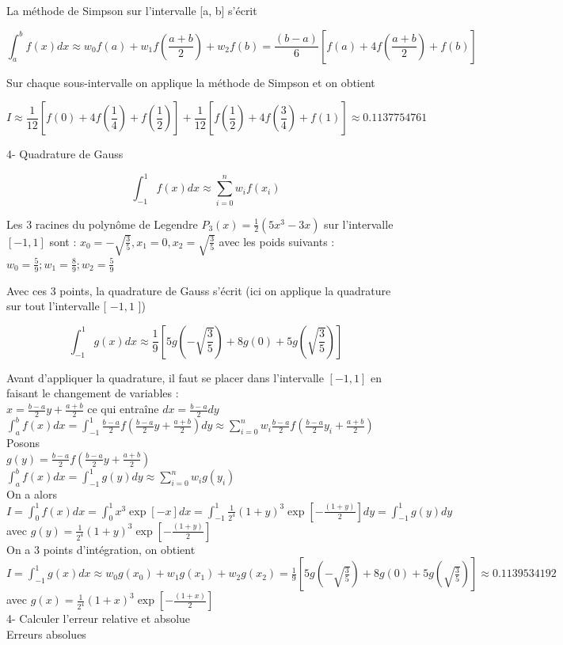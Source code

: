 \documentclass[10pt]{article}
\begin{document}
La méthode de Simpson sur l'intervalle [a, b] s'écrit

\[
\int_{a}^{b} f(x) d x \approx w_{0} f(a)+w_{1} f\left(\frac{a+b}{2}\right)+w_{2} f(b)=\frac{(b-a)}{6}\left[f(a)+4 f\left(\frac{a+b}{2}\right)+f(b)\right]
\]

Sur chaque sous-intervalle on applique la méthode de Simpson et on obtient

\[
I \approx \frac{1}{12}\left[f(0)+4 f\left(\frac{1}{4}\right)+f\left(\frac{1}{2}\right)\right]+\frac{1}{12}\left[f\left(\frac{1}{2}\right)+4 f\left(\frac{3}{4}\right)+f(1)\right] \approx 0.1137754761
\]

4- Quadrature de Gauss

\[
\int_{-1}^{1} f(x) d x \approx \sum_{i=0}^{n} w_{i} f\left(x_{i}\right)
\]

Les 3 racines du polynôme de Legendre \(P_{3}(x)=\frac{1}{2}\left(5 x^{3}-3 x\right)\) sur l'intervalle \([-1,1]\) sont : \(x_{0}=-\sqrt{\frac{3}{5}}, x_{1}=0, x_{2}=\sqrt{\frac{3}{5}}\) avec les poids suivants : \(w_{0}=\frac{5}{9} ; w_{1}=\frac{8}{9} ; w_{2}=\frac{5}{9}\)

Avec ces 3 points, la quadrature de Gauss s'écrit (ici on applique la quadrature sur tout l'intervalle [ \(-1,1\) ])

\[
\int_{-1}^{1} g(x) d x \approx \frac{1}{9}\left[5 g\left(-\sqrt{\frac{3}{5}}\right)+8 g(0)+5 g\left(\sqrt{\frac{3}{5}}\right)\right]
\]

Avant d'appliquer la quadrature, il faut se placer dans l'intervalle \([-1,1]\) en faisant le changement de variables :\\
\(x=\frac{b-a}{2} y+\frac{a+b}{2}\) ce qui entraîne \(d x=\frac{b-a}{2} d y\)\\
\(\int_{a}^{b} f(x) d x=\int_{-1}^{1} \frac{b-a}{2} f\left(\frac{b-a}{2} y+\frac{a+b}{2}\right) d y \approx \sum_{i=0}^{n} w_{i} \frac{b-a}{2} f\left(\frac{b-a}{2} y_{i}+\frac{a+b}{2}\right)\)\\
Posons\\
\(g(y)=\frac{b-a}{2} f\left(\frac{b-a}{2} y+\frac{a+b}{2}\right)\)\\
\(\int_{a}^{b} f(x) d x=\int_{-1}^{1} g(y) d y \approx \sum_{i=0}^{n} w_{i} g\left(y_{i}\right)\)\\
On a alors\\
\(I=\int_{0}^{1} f(x) d x=\int_{0}^{1} x^{3} \exp [-x] d x=\int_{-1}^{1} \frac{1}{2^{4}}(1+y)^{3} \exp \left[-\frac{(1+y)}{2}\right] d y=\int_{-1}^{1} g(y) d y\)\\
avec \(g(y)=\frac{1}{2^{4}}(1+y)^{3} \exp \left[-\frac{(1+y)}{2}\right]\)\\
On a 3 points d'intégration, on obtient\\
\(I=\int_{-1}^{1} g(x) d x \approx w_{0} g\left(x_{0}\right)+w_{1} g\left(x_{1}\right)+w_{2} g\left(x_{2}\right)=\frac{1}{9}\left[5 g\left(-\sqrt{\frac{3}{5}}\right)+8 g(0)+5 g\left(\sqrt{\frac{3}{5}}\right)\right] \approx 0.1139534192\)\\
avec \(g(x)=\frac{1}{2^{4}}(1+x)^{3} \exp \left[-\frac{(1+x)}{2}\right]\)\\
4- Calculer l'erreur relative et absolue\\
Erreurs absolues
\end{document}
